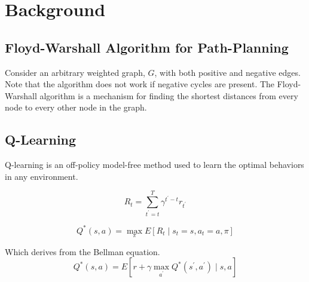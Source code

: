 \section{Background}

\subsection{Floyd-Warshall Algorithm for Path-Planning}

Consider an arbitrary weighted graph, $G$, with both positive and
negative edges. Note that the algorithm does not work if negative cycles
are present. The Floyd-Warshall algorithm is a mechanism for finding the
shortest distances from every node to every other node in the graph. 


\subsection{Q-Learning}
Q-learning is an off-policy model-free method used to learn the optimal
behaviors in any environment. 

\begin{equation}
    R_t = \sum_{t^{'}=t}^{T} \gamma^{t^{'}-t} r_{t^{'}}
\end{equation}

\begin{equation}
    Q^*(s, a) = \max_{\pi} E[R_t \mid s_t=s, a_t=a, \pi]
\end{equation}


\noindent
Which derives from the Bellman equation.
\begin{equation}
    Q^*(s, a) = E[r + \gamma \max_{a^{'}} Q^*(s^{'}, a^{'}) \mid s, a]
\end{equation}

